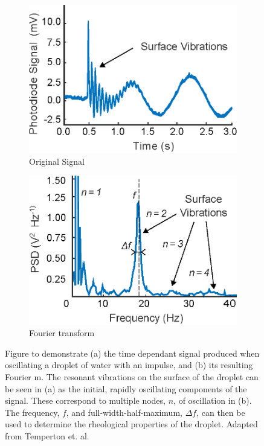 \documentclass{physics_article_B}
\begin{document}
        \begin{figure}[H]
            \centering
                \begin{subfigure}[b]{0.48\textwidth}\hspace*{0cm}\includegraphics[width=\textwidth]{Figures/TempertonSignal.eps}
                    \caption{Original Signal}
                    \label{fig:temperton:signal}
                \end{subfigure}\hspace{3pt}
                \begin{subfigure}[b]{0.48\textwidth}\hspace*{0cm}\includegraphics[width=\textwidth]{Figures/TempertonSignalPD.eps}
                    \caption{Fourier transform}
                    \label{fig:temperton:PD}
                \end{subfigure}
            \caption{Figure to demonstrate (a) the time dependant signal produced when oscillating a droplet of water with an impulse, and (b) its resulting Fourier m. The resonant vibrations on the surface of the droplet can be seen in (a) as the initial, rapidly oscillating components of the signal. These correspond to multiple nodes, $n$, of oscillation in (b). The frequency, $f$, and full-width-half-maximum, $\Delta f$, can then be used to determine the rheological properties of the droplet. Adapted from Temperton et. al.\cite{temperton}}\label{fig:temperton}
        \end{figure}
\end{document}
